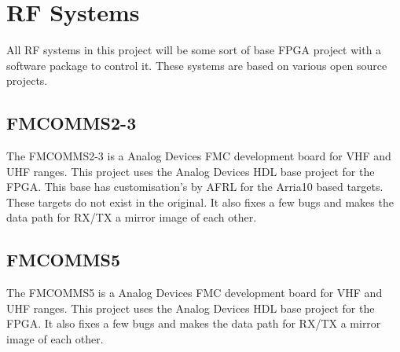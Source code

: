 \section{RF Systems}

\par
All RF systems in this project will be some sort of base FPGA project with a software package to control it.
These systems are based on various open source projects.

\subsection{FMCOMMS2-3}

\par
The FMCOMMS2-3 is a Analog Devices FMC development board for VHF and UHF ranges. This project uses the Analog
Devices HDL base project for the FPGA. This base has customisation's by AFRL for the Arria10 based targets. These
targets do not exist in the original. It also fixes a few bugs and makes the data path for RX/TX a mirror image of
each other.

\subsection{FMCOMMS5}

\par
The FMCOMMS5 is a Analog Devices FMC development board for VHF and UHF ranges. This project uses the Analog
Devices HDL base project for the FPGA. It also fixes a few bugs and makes the data path for RX/TX a mirror image of
each other.
